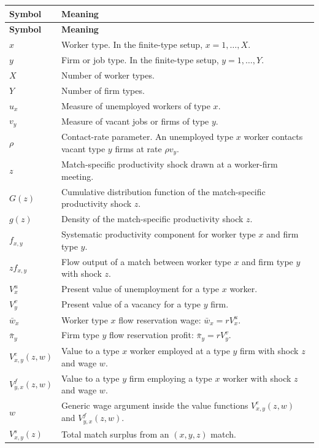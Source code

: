 \documentclass[11pt]{article}
\newcommand{\1}{\mathbf{1}}
\begin{document}
\begin{longtable}{p{}p{}}
\toprule
\textbf{Symbol} & \textbf{Meaning} \\
\midrule
\endfirsthead
\toprule
\textbf{Symbol} & \textbf{Meaning} \\
\midrule
\endhead
\bottomrule
\endfoot
$x$ & Worker type. In the finite-type setup, $x=1,\ldots,X$. \\
$y$ & Firm or job type. In the finite-type setup, $y=1,\ldots,Y$. \\
$X$ & Number of worker types. \\
$Y$ & Number of firm types. \\
$u_x$ & Measure of unemployed workers of type $x$. \\
$v_y$ & Measure of vacant jobs or firms of type $y$. \\
$\rho$ & Contact-rate parameter. An unemployed type $x$ worker contacts vacant type $y$ firms at rate $\rho v_y$. \\
$z$ & Match-specific productivity shock drawn at a worker-firm meeting. \\
$G(z)$ & Cumulative distribution function of the match-specific productivity shock $z$. \\
$g(z)$ & Density of the match-specific productivity shock $z$. \\
$f_{x,y}$ & Systematic productivity component for worker type $x$ and firm type $y$. \\
$z f_{x,y}$ & Flow output of a match between worker type $x$ and firm type $y$ with shock $z$. \\
$V_x^u$ & Present value of unemployment for a type $x$ worker. \\
$V_y^v$ & Present value of a vacancy for a type $y$ firm. \\
$\bar w_x$ & Worker type $x$ flow reservation wage: $\bar w_x=rV_x^u$. \\
$\bar \pi_y$ & Firm type $y$ flow reservation profit: $\bar \pi_y=rV_y^v$. \\
$V^e_{x,y}(z,w)$ & Value to a type $x$ worker employed at a type $y$ firm with shock $z$ and wage $w$. \\
$V^f_{y,x}(z,w)$ & Value to a type $y$ firm employing a type $x$ worker with shock $z$ and wage $w$. \\
$w$ & Generic wage argument inside the value functions $V^e_{x,y}(z,w)$ and $V^f_{y,x}(z,w)$. \\
$V^s_{x,y}(z)$ & Total match surplus from an $(x,y,z)$ match. \\

\end{longtable}
\end{document}
